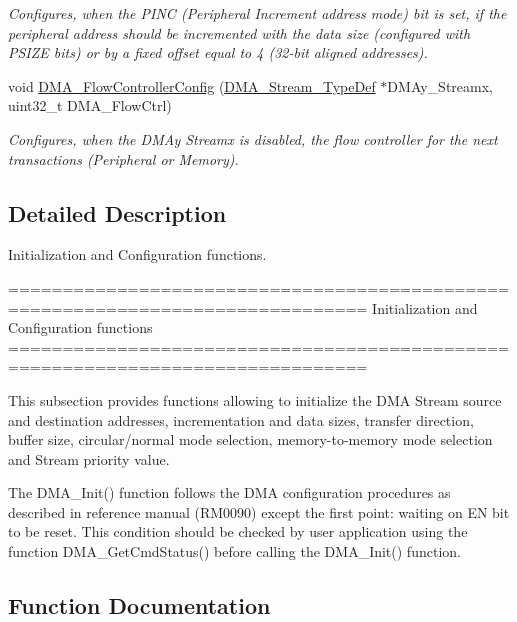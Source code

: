 \begin{DoxyCompactItemize}
\begin{DoxyCompactList}\small\item\em Configures, when the P\+I\+NC (Peripheral Increment address mode) bit is set, if the peripheral address should be incremented with the data size (configured with P\+S\+I\+ZE bits) or by a fixed offset equal to 4 (32-\/bit aligned addresses). \end{DoxyCompactList}\item 
void \hyperlink{group___d_m_a___group1_ga77f7628f6be9d6d088127eceb090b8b2}{D\+M\+A\+\_\+\+Flow\+Controller\+Config} (\hyperlink{struct_d_m_a___stream___type_def}{D\+M\+A\+\_\+\+Stream\+\_\+\+Type\+Def} $\ast$D\+M\+Ay\+\_\+\+Streamx, uint32\+\_\+t D\+M\+A\+\_\+\+Flow\+Ctrl)
\begin{DoxyCompactList}\small\item\em Configures, when the D\+M\+Ay Streamx is disabled, the flow controller for the next transactions (Peripheral or Memory). \end{DoxyCompactList}\end{DoxyCompactItemize}


\subsection{Detailed Description}
Initialization and Configuration functions. 

\begin{DoxyVerb} ===============================================================================
                 Initialization and Configuration functions
 ===============================================================================  

  This subsection provides functions allowing to initialize the DMA Stream source
  and destination addresses, incrementation and data sizes, transfer direction, 
  buffer size, circular/normal mode selection, memory-to-memory mode selection 
  and Stream priority value.
  
  The DMA_Init() function follows the DMA configuration procedures as described in
  reference manual (RM0090) except the first point: waiting on EN bit to be reset.
  This condition should be checked by user application using the function DMA_GetCmdStatus()
  before calling the DMA_Init() function.\end{DoxyVerb}
 

\subsection{Function Documentation}
\mbox{\label{group___d_m_a___group1_gab2bea22f9f6dc62fdd7afb385a0c1f73}} 
